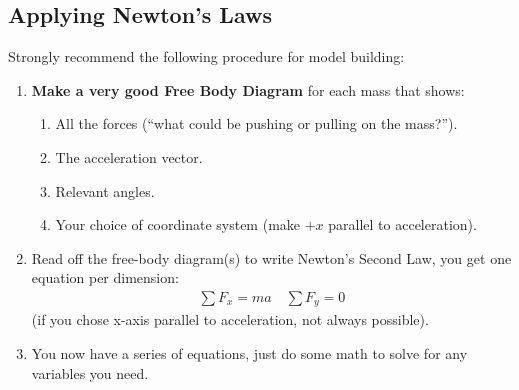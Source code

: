 \documentclass[aspectratio=169,
hyperref={colorlinks,urlcolor=blue}
]{beamer}
\begin{document}
\subsection{Applying Newton's Laws}
\label{subsec:applyingnewtonslaws}
{\scriptsize
Strongly recommend the following procedure for model building:
\begin{enumerate}
\item \textbf{Make a very good Free Body Diagram} for each mass that shows:
\begin{enumerate}
\scriptsize
\item All the forces (``what could be pushing or pulling on the mass?'').
\item The acceleration vector.
\item Relevant angles.
\item Your choice of coordinate system (make $+x$ parallel to acceleration).
\end{enumerate}
\item Read off the free-body diagram(s) to write Newton's Second Law, you get one equation per dimension:
\begin{align*}
\sum F_x = ma \quad \sum F_y=0
\end{align*}
 (if you chose x-axis parallel to acceleration, not always possible).
\item You now have a series of equations, just do some math to solve for any variables you need.
\end{enumerate}

}
\end{document}
